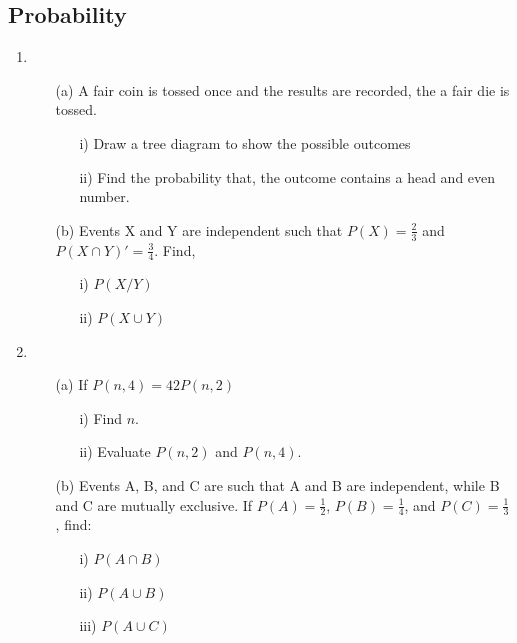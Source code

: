 \subsection{Probability}

\begin{enumerate}
	\item
	\begin{enumerate}[topsep=0ex,itemsep=0ex,partopsep=1ex,parsep=1ex]
		\item[(a)] A fair coin is tossed once and the results are recorded, the a fair die is tossed.
		\begin{enumerate}[topsep=0ex,itemsep=0ex,partopsep=1ex,parsep=1ex]
			\item[i)] Draw a tree diagram to show the possible outcomes
			\item[ii)] Find the probability that, the outcome contains a head and even number.
		\end{enumerate}
		
		\item[(b)] Events X and Y are independent such that $P(X) = \frac{2}{3}$ and $P(X\cap Y)' = \frac{3}{4}$. Find, 
		\begin{enumerate}[topsep=0ex,itemsep=0ex,partopsep=1ex,parsep=1ex]
			\item[i)] $P(X/Y)$
			\item[ii)] $P(X \cup Y)$
		\end{enumerate}
	\end{enumerate}
	
	\item
	\begin{enumerate}[topsep=0ex,itemsep=0ex,partopsep=1ex,parsep=1ex]
		\item[(a)] If $P(n,4) = 42P(n,2)$
		\begin{enumerate}[topsep=0ex,itemsep=0ex,partopsep=1ex,parsep=1ex]
			\item[i)] Find $n$.
			\item[ii)] Evaluate $P(n,2)$ and $P(n,4)$.
		\end{enumerate}
		
		\item[(b)] Events A, B, and C are such that A and B are independent, while B and C are mutually exclusive. If $P(A) = \frac{1}{2}$, $P(B) = \frac{1}{4}$, and $P(C) = \frac{1}{3}$, find:
		\begin{enumerate}[topsep=0ex,itemsep=0ex,partopsep=1ex,parsep=1ex]
			\item[i)] $P(A \cap B)$
			\item[ii)] $P(A \cup B)$
			\item[iii)] $P(A \cup C)$
		\end{enumerate}
	\end{enumerate}	
	

\end{enumerate}
